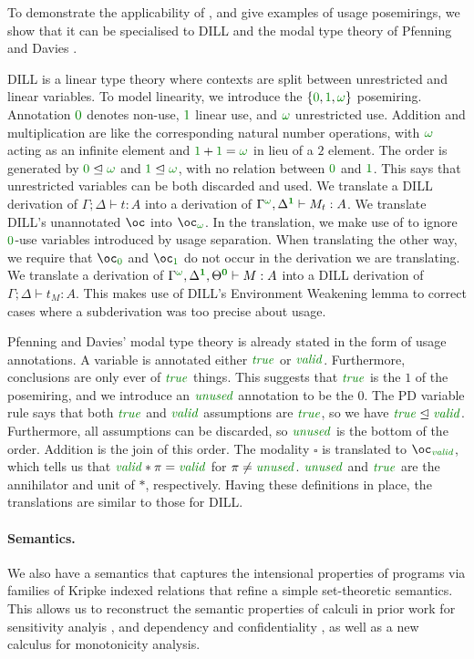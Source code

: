 \documentclass[a4paper]{easychair}
\begin{document}
To demonstrate the applicability of \name{}, and give examples of usage
posemirings, we show that it can be specialised to DILL \cite{Barber1996} and
the modal type theory of Pfenning and Davies \cite{judgmental}.

DILL is a linear type theory where contexts are split between unrestricted and
linear variables.
To model linearity, we introduce the $\{\zero, \linear, \unrestricted\}$
posemiring.
Annotation $\zero$ denotes non-use, $\linear$ linear use, and
$\unrestricted$ unrestricted use.
Addition and multiplication are like the corresponding natural number
operations, with $\unrestricted$ acting as an infinite element and $\linear +
\linear = \unrestricted$ in lieu of a $2$ element.
The order is generated by $\zero \subres \unrestricted$ and $\linear \subres
\unrestricted$, with no relation between $\zero$ and $\linear$.
This says that unrestricted variables can be both discarded and used.
We translate a DILL derivation of $\Gamma; \Delta \vdash t : A$ into a \name{}
derivation of $\ctx{\Gamma}{\vct \unrestricted}, \ctx{\Delta}{\vct \linear}
\vdash M_t : A$.
We translate DILL's unannotated $\oc$ into $\excl{\unrestricted}{}$.
In the translation, we make use of  to ignore $\zero$-use
variables introduced by usage separation.
When translating the other way, we require that $\excl{\zero}{}$ and
$\excl{\linear}{}$ do not occur in the derivation we are translating.
We translate a \name{} derivation of $\ctx{\Gamma}{\vct \unrestricted},
\ctx{\Delta}{\vct \linear}, \ctx{\Theta}{\vct \zero} \vdash M : A$ into a DILL
derivation of $\Gamma; \Delta \vdash t_M : A$.
This makes use of DILL's Environment Weakening lemma to correct cases where a
\name{} subderivation was too precise about usage.

Pfenning and Davies' modal type theory is already stated in the form of usage
annotations.
A variable is annotated either $\true$ or $\valid$.
Furthermore, conclusions are only ever of $\true$ things.
This suggests that $\true$ is the $1$ of the posemiring, and we introduce an
$\unused$ annotation to be the $0$.
The PD variable rule says that both $\true$ and $\valid$ assumptions are
$\true$, so we have $\true \subres \valid$.
Furthermore, all assumptions can be discarded, so $\unused$ is the bottom of the
order.
Addition is the join of this order.
The modality $\square$ is translated to $\excl{\valid}{}$, which tells us that
$\valid * \pi = \valid$ for $\pi \neq \unused$. 
$\unused$ and $\true$ are the annihilator and unit of $*$, respectively.
Having these definitions in place, the translations are similar to those for
DILL.

\paragraph{Semantics.}
We also have a semantics that captures the intensional properties of programs
via families of Kripke indexed relations that refine a simple set-theoretic
semantics.
This allows us to reconstruct the semantic properties of calculi in prior work
for sensitivity analyis \cite{reed10distance}, and dependency and
confidentiality \cite{abadi99core}, as well as a new calculus for monotonicity
analysis.



\end{document}
